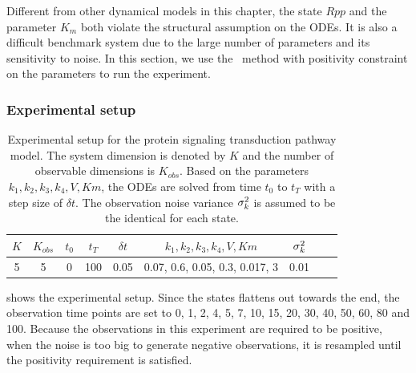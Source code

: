 Different from other dynamical models in this chapter, the state $Rpp$ and the parameter $K_m$ both violate the structural assumption on the ODEs.
It is also a difficult benchmark system due to the large number of parameters and its sensitivity to noise.
In this section, we use the \algolpmf\ method with positivity constraint on the parameters to run the experiment.

\subsubsection*{Experimental setup}

\begin{table}
\centering
\caption{Experimental setup for the protein signaling transduction pathway model. The system dimension is denoted by $K$ and the number of observable dimensions is $K_{obs}$. Based on the parameters $k_1, k_2, k_3, k_4, V, Km$, the ODEs are solved from time $t_0$ to $t_T$ with a step size of $\delta t$. The observation noise variance $\sigma_{k}^2$ is assumed to be the identical for each state.}
\label{table-protein-setup}
\begin{tabular}{|c|c|c|c|c|c|c|c|c|}
\hline
$K$ & $K_{obs}$ & $t_0$ & $t_T$ & $\delta t$ & $k_1, k_2, k_3, k_4, V, Km$ & $\sigma_{k}^2$ \\ \hline
5 & 5 & 0 & 100 & 0.05 & 0.07, 0.6, 0.05, 0.3, 0.017, 3 & 0.01\\ \hline
\end{tabular}
\end{table}

 shows the experimental setup. 
Since the states flattens out towards the end, the observation time points are set to 0, 1, 2, 4, 5, 7, 10, 15, 20, 30, 40, 50, 60, 80 and 100.
Because the observations in this experiment are required to be positive, when the noise is too big to generate negative observations, it is resampled until the positivity requirement is satisfied.

